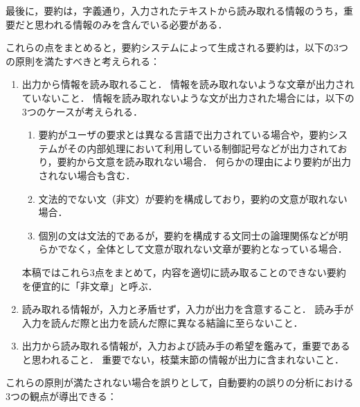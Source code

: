 最後に，要約は，字義通り，入力されたテキストから読み取れる情報のうち，重要だと思われる情報のみを含んでいる必要がある．

これらの点をまとめると，要約システムによって生成される要約は，以下の3つの原則を満たすべきと考えられる：

\begin{enumerate}
\item
出力から情報を読み取れること．
情報を読み取れないような文章が出力されていないこと．
情報を読み取れないような文が出力された場合には，以下の3つのケースが考えられる．
\begin{enumerate}
\item
要約がユーザの要求とは異なる言語で出力されている場合や，要約システムがその内部処理において利用している制御記号などが出力されており，要約から文意を読み取れない場合．
何らかの理由により要約が出力されない場合も含む．
\item
文法的でない文（非文）が要約を構成しており，要約の文意が取れない場合．
\item
個別の文は文法的であるが，要約を構成する文同士の論理関係などが明らかでなく，全体として文意が取れない文章が要約となっている場合．
\end{enumerate}
本稿ではこれら3点をまとめて，内容を適切に読み取ることのできない要約を便宜的に「非文章」と呼ぶ．
\item
読み取れる情報が，入力と矛盾せず，入力が出力を含意すること．
読み手が入力を読んだ際と出力を読んだ際に異なる結論に至らないこと．
\item
出力から読み取れる情報が，入力および読み手の希望を鑑みて，重要であると思われること．
重要でない，枝葉末節の情報が出力に含まれないこと．
\end{enumerate}

これらの原則が満たされない場合を誤りとして，自動要約の誤りの分析における3つの観点が導出できる：

